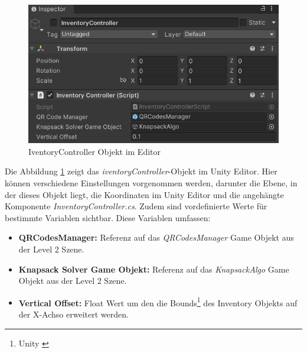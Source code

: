\begin{figure}[h]
    \centering
    \includegraphics[scale=0.8]{images/invCon_Editor}
    \caption{IventoryController Objekt im Editor}
    \label{fig:InventoryController_Editor}
\end{figure}

Die Abbildung \ref{fig:InventoryController_Editor} zeigt das \textit{iventoryController}-Objekt im Unity Editor.  Hier
können verschiedene Einstellungen vorgenommen werden, darunter die Ebene, in der dieses Objekt liegt, die Koordinaten
im Unity Editor und die angehängte Komponente \textit{InventoryController.cs}. Zudem sind vordefinierte Werte für bestimmte
Variablen sichtbar. Diese Variablen umfassen:

\begin{itemize}
    \item \textbf{QRCodesManager:} Referenz auf das \textit{QRCodesManager} Game Objekt aus der Level 2 Szene.
    \item \textbf{Knapsack Solver Game Objekt:} Referenz auf das \textit{KnapsackAlgo} Game Objekt aus der Level 2 Szene.
    \item \textbf{Vertical Offset:} Float Wert um den die Bounds\footnote{Unity \cite{Bounds}} des Inventory Objekts auf der X-Achso erweitert werden.\\
\end{itemize}

